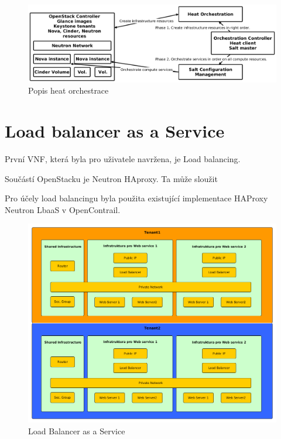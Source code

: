 \begin{figure}[h]
\begin{centering}
\includegraphics[scale=0.21]{images/heat}
\par\end{centering}
\caption{Popis heat orchestrace\label{fig:heat}}
\end{figure}

\section{Load balancer as a Service}

První VNF, která byla pro uživatele navržena, je Load balancing. 

Součástí OpenStacku je Neutron HAproxy. Ta může sloužit 

Pro účely load balancingu byla použita existující implementace HAProxy Neutron LbaaS v OpenContrail. 

\begin{figure}[h]
\begin{centering}
\includegraphics[scale=0.43]{images/LoadBalancer}
\par\end{centering}
\caption{Load Balancer as a Service\label{fig:LoadBalancer}}
\end{figure}

